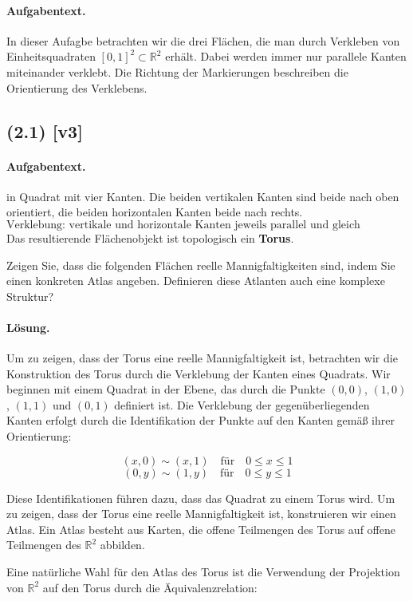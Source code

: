 \documentclass[11pt,a4paper]{article}
\begin{document}
\paragraph{Aufgabentext.}
In dieser Aufagbe betrachten wir die drei Flächen, die man durch Verkleben von Einheitsquadraten $[0,1]^2 \subset \mathbb{R}^2$ erhält. Dabei werden immer nur parallele Kanten miteinander verklebt. Die Richtung der Markierungen beschreiben die Orientierung des Verklebens.

\subsection*{(2.1) [v3]}
\paragraph{Aufgabentext.}
in Quadrat mit vier Kanten. 
Die beiden vertikalen Kanten sind beide nach oben orientiert, 
die beiden horizontalen Kanten beide nach rechts.  
\[
\text{Verklebung: vertikale und horizontale Kanten jeweils parallel und gleich orientiert.}
\]
Das resultierende Flächenobjekt ist topologisch ein \textbf{Torus}.

Zeigen Sie, dass die folgenden Flächen reelle Mannigfaltigkeiten sind, indem Sie einen konkreten Atlas angeben. Definieren diese Atlanten auch eine komplexe Struktur?

\paragraph{Lösung.}
Um zu zeigen, dass der Torus eine reelle Mannigfaltigkeit ist, betrachten wir die Konstruktion des Torus durch die Verklebung der Kanten eines Quadrats. Wir beginnen mit einem Quadrat in der Ebene, das durch die Punkte \( (0,0) \), \( (1,0) \), \( (1,1) \) und \( (0,1) \) definiert ist. Die Verklebung der gegenüberliegenden Kanten erfolgt durch die Identifikation der Punkte auf den Kanten gemäß ihrer Orientierung:

\[
(x,0) \sim (x,1) \quad \text{für} \quad 0 \leq x \leq 1
\]
\[
(0,y) \sim (1,y) \quad \text{für} \quad 0 \leq y \leq 1
\]

Diese Identifikationen führen dazu, dass das Quadrat zu einem Torus wird. Um zu zeigen, dass der Torus eine reelle Mannigfaltigkeit ist, konstruieren wir einen Atlas. Ein Atlas besteht aus Karten, die offene Teilmengen des Torus auf offene Teilmengen des \(\mathbb{R}^2\) abbilden.

Eine natürliche Wahl für den Atlas des Torus ist die Verwendung der Projektion von \(\mathbb{R}^2\) auf den Torus durch die Äquivalenzrelation:
\end{document}
